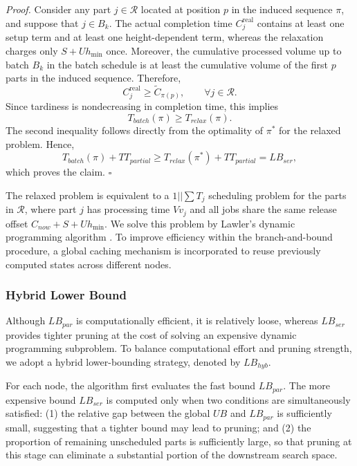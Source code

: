 \documentclass[letterpaper, 10 pt, conference]{ieeeconf}  %
\begin{document}
\noindent \textit{Proof.}
Consider any part $j \in \mathcal{R}$ located at position $p$ in the induced sequence $\pi$, and suppose that $j \in B_k$. The actual completion time $C_j^{\mathrm{real}}$ contains at least one setup term and at least one height-dependent term, whereas the relaxation charges only $S + U h_{\min}$ once. Moreover, the cumulative processed volume up to batch $B_k$ in the batch schedule is at least the cumulative volume of the first $p$ parts in the induced sequence. Therefore,
\begin{equation*}
    C_j^{\mathrm{real}}
    \ge
    \widetilde{C}_{\pi(p)},
    \qquad \forall j \in \mathcal{R}.
\end{equation*}
Since tardiness is nondecreasing in completion time, this implies
\begin{equation*}
    T_{batch}(\pi) \ge T_{relax}(\pi).
\end{equation*}
The second inequality follows directly from the optimality of $\pi^*$ for the relaxed problem. Hence,
\begin{equation*}
    T_{batch}(\pi) + TT_{partial} \ge T_{relax}(\pi^*) +TT_{partial} = LB_{ser},
\end{equation*}
which proves the claim.
\hfill$\square$

The relaxed problem is equivalent to a $1||\sum T_j$ scheduling problem for the parts in $\mathcal{R}$, where part $j$ has processing time $V v_j$ and all jobs share the same release offset $C_{now} + S + U h_{\min}$. We solve this problem by Lawler's dynamic programming algorithm \cite{lawlerPseudopolynomialAlgorithmSequencing1977}. To improve efficiency within the branch-and-bound procedure, a global caching mechanism is incorporated to reuse previously computed states across different nodes.

\subsubsection{Hybrid Lower Bound}

Although $LB_{par}$ is computationally efficient, it is relatively loose, whereas $LB_{ser}$ provides tighter pruning at the cost of solving an expensive dynamic programming subproblem. To balance computational effort and pruning strength, we adopt a hybrid lower-bounding strategy, denoted by $LB_{hyb}$.

For each node, the algorithm first evaluates the fast bound $LB_{par}$. The more expensive bound $LB_{ser}$ is computed only when two conditions are simultaneously satisfied: (1) the relative gap between the global $UB$ and $LB_{par}$ is sufficiently small, suggesting that a tighter bound may lead to pruning; and (2) the proportion of remaining unscheduled parts is sufficiently large, so that pruning at this stage can eliminate a substantial portion of the downstream search space.
\end{document}
